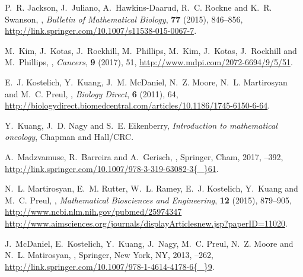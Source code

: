 \documentclass{aims}
\numberwithin{equation}{section}
\begin{document}
\begin{thebibliography}{10}
\newblock P.~R. Jackson, J.~Juliano, A.~Hawkins-Daarud, R.~C. Rockne and K.~R.
  Swanson,
,
\newblock \emph{Bulletin of Mathematical Biology}, \textbf{77} (2015),
  846--856,
\newblock \urlprefix\url{http://link.springer.com/10.1007/s11538-015-0067-7}.

\newblock M.~Kim, J.~Kotas, J.~Rockhill, M.~Phillips, M.~Kim, J.~Kotas,
  J.~Rockhill and M.~Phillips,
,
\newblock \emph{Cancers}, \textbf{9} (2017), 51,
\newblock \urlprefix\url{http://www.mdpi.com/2072-6694/9/5/51}.

\newblock E.~J. Kostelich, Y.~Kuang, J.~M. McDaniel, N.~Z. Moore, N.~L.
  Martirosyan and M.~C. Preul,
,
\newblock \emph{Biology Direct}, \textbf{6} (2011), 64,
\newblock
  \urlprefix\url{http://biologydirect.biomedcentral.com/articles/10.1186/1745-6150-6-64}.

\newblock Y.~Kuang, J.~D. Nagy and S.~E. Eikenberry,
\newblock \emph{{Introduction to mathematical oncology}},
\newblock Chapman and Hall/CRC.

\newblock A.~Madzvamuse, R.~Barreira and A.~Gerisch,
,
\newblock Springer, Cham, 2017,
--392,
\newblock
  \urlprefix\url{http://link.springer.com/10.1007/978-3-319-63082-3{\_}61}.

\newblock N.~L. Martirosyan, E.~M. Rutter, W.~L. Ramey, E.~J. Kostelich,
  Y.~Kuang and M.~C. Preul,
,
\newblock \emph{Mathematical Biosciences and Engineering}, \textbf{12} (2015),
  879--905,
\newblock \urlprefix\url{http://www.ncbi.nlm.nih.gov/pubmed/25974347
  http://www.aimsciences.org/journals/displayArticlesnew.jsp?paperID=11020}.

\newblock J.~McDaniel, E.~Kostelich, Y.~Kuang, J.~Nagy, M.~C. Preul, N.~Z.
  Moore and N.~L. Matirosyan,
,
\newblock Springer, New York, NY, 2013,
--262,
\newblock
  \urlprefix\url{http://link.springer.com/10.1007/978-1-4614-4178-6{\_}9}.


\end{thebibliography}
\end{document}
